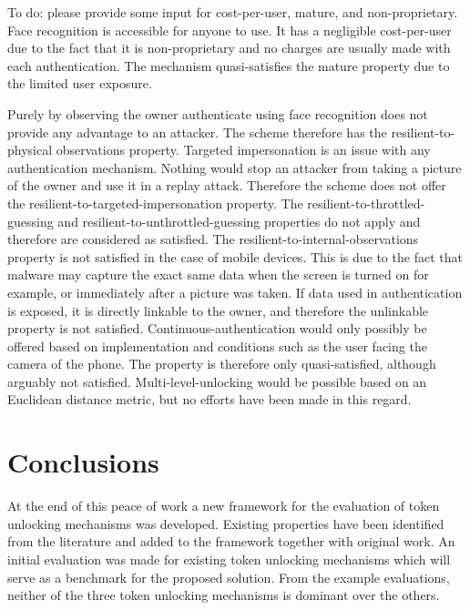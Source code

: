 	
	To do: please provide some input for cost-per-user, mature, and non-proprietary. Face recognition is accessible for anyone to use. It has a negligible cost-per-user due to the fact that it is non-proprietary and no charges are usually made with each authentication. The mechanism quasi-satisfies the mature property due to the limited user exposure.
	
	Purely by observing the owner authenticate using face recognition does not provide any advantage to an attacker. The scheme therefore has the resilient-to-physical observations property. Targeted impersonation is an issue with any authentication mechanism. Nothing would stop an attacker from taking a picture of the owner and use it in a replay attack. Therefore the scheme does not offer the resilient-to-targeted-impersonation property. The resilient-to-throttled-guessing and resilient-to-unthrottled-guessing properties do not apply and therefore are considered as satisfied.  The resilient-to-internal-observations property is not satisfied in the case of mobile devices. This is due to the fact that malware may capture the exact same data when the screen is turned on for example, or immediately after a picture was taken. If data used in authentication is exposed, it is directly linkable to the owner, and therefore the unlinkable property is not satisfied. Continuous-authentication would only possibly be offered based on implementation and conditions such as the user facing the camera of the phone. The property is therefore only quasi-satisfied, although arguably not satisfied. Multi-level-unlocking would be possible based on an Euclidean distance metric, but no efforts have been made in this regard. 

\section{Conclusions}
At the end of this peace of work a new framework for the evaluation of token unlocking mechanisms was developed. Existing properties have been identified from the literature and added to the framework together with original work. An initial evaluation was made for existing token unlocking mechanisms which will serve as a benchmark for the proposed solution. From the example evaluations, neither of the three token unlocking mechanisms is dominant over the others.

